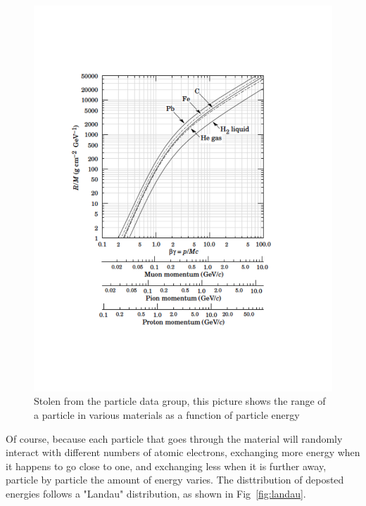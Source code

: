 \begin{figure}[h]
\centering\includegraphics[scale=0.5]{./particleinteractions/Pictures/pdgrange.pdf}
\caption{Stolen from the particle data group, this picture shows the range of a particle in various materials as a function of particle energy }
\label{fig:pdgrange}
\end{figure}

Of course, because each particle that goes through the material will randomly interact with different numbers of atomic electrons, exchanging more energy when it happens to go close to one, and exchanging less when it is further away, particle by particle the amount of energy varies.  The disttribution of deposted energies follows a "Landau" distribution, as shown in Fig~\ref{fig:landau}.


